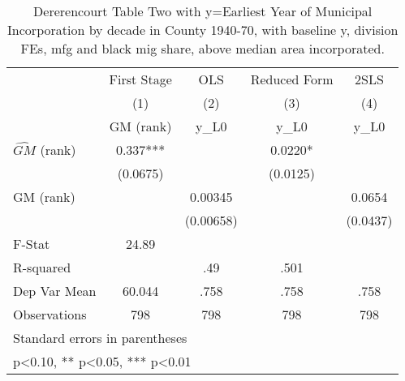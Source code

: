 \begin{table}[htbp]\centering
\def\sym#1{\ifmmode^{#1}\else\(^{#1}\)\fi}
\caption{Dererencourt Table Two with y=Earliest Year of Municipal Incorporation by decade in County 1940-70, with baseline y, division FEs, mfg and black mig share, above median area incorporated.}
\begin{tabular}{l*{4}{c}}
\toprule
                    & First Stage   &         OLS   &Reduced Form   &        2SLS   \\
                    &\multicolumn{1}{c}{(1)}&\multicolumn{1}{c}{(2)}&\multicolumn{1}{c}{(3)}&\multicolumn{1}{c}{(4)}\\
                    &\multicolumn{1}{c}{GM  (rank)}&\multicolumn{1}{c}{y\_L0}&\multicolumn{1}{c}{y\_L0}&\multicolumn{1}{c}{y\_L0}\\
\midrule
$\hat{GM}$ (rank)   &       0.337***&               &      0.0220*  &               \\
                    &    (0.0675)   &               &    (0.0125)   &               \\
\addlinespace
GM  (rank)          &               &     0.00345   &               &      0.0654   \\
                    &               &   (0.00658)   &               &    (0.0437)   \\
\midrule
F-Stat              &       24.89   &               &               &               \\
R-squared           &               &         .49   &        .501   &               \\
Dep Var Mean        &      60.044   &        .758   &        .758   &        .758   \\
Observations        &         798   &         798   &         798   &         798   \\
\bottomrule
\multicolumn{5}{l}{\footnotesize Standard errors in parentheses}\\
\multicolumn{5}{l}{\footnotesize * p<0.10, ** p<0.05, *** p<0.01}\\
\end{tabular}
\end{table}
